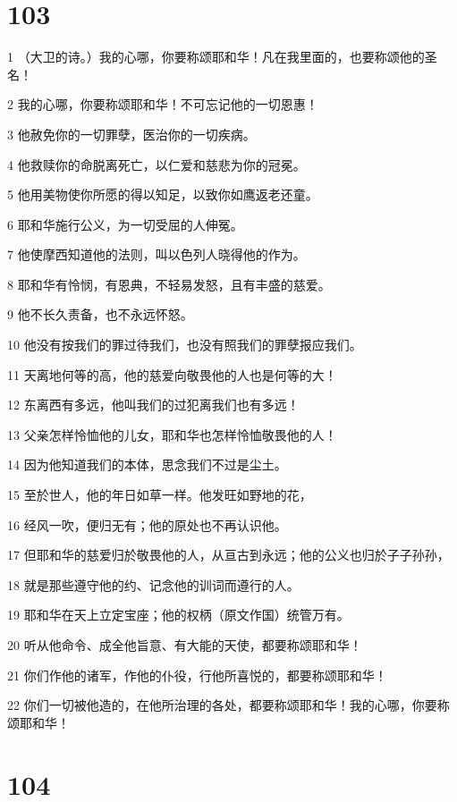 \chapter{103}

\par 1 （大卫的诗。）我的心哪，你要称颂耶和华！凡在我里面的，也要称颂他的圣名！
\par 2 我的心哪，你要称颂耶和华！不可忘记他的一切恩惠！
\par 3 他赦免你的一切罪孽，医治你的一切疾病。
\par 4 他救赎你的命脱离死亡，以仁爱和慈悲为你的冠冕。
\par 5 他用美物使你所愿的得以知足，以致你如鹰返老还童。
\par 6 耶和华施行公义，为一切受屈的人伸冤。
\par 7 他使摩西知道他的法则，叫以色列人晓得他的作为。
\par 8 耶和华有怜悯，有恩典，不轻易发怒，且有丰盛的慈爱。
\par 9 他不长久责备，也不永远怀怒。
\par 10 他没有按我们的罪过待我们，也没有照我们的罪孽报应我们。
\par 11 天离地何等的高，他的慈爱向敬畏他的人也是何等的大！
\par 12 东离西有多远，他叫我们的过犯离我们也有多远！
\par 13 父亲怎样怜恤他的儿女，耶和华也怎样怜恤敬畏他的人！
\par 14 因为他知道我们的本体，思念我们不过是尘土。
\par 15 至於世人，他的年日如草一样。他发旺如野地的花，
\par 16 经风一吹，便归无有；他的原处也不再认识他。
\par 17 但耶和华的慈爱归於敬畏他的人，从亘古到永远；他的公义也归於子子孙孙，
\par 18 就是那些遵守他的约、记念他的训词而遵行的人。
\par 19 耶和华在天上立定宝座；他的权柄（原文作国）统管万有。
\par 20 听从他命令、成全他旨意、有大能的天使，都要称颂耶和华！
\par 21 你们作他的诸军，作他的仆役，行他所喜悦的，都要称颂耶和华！
\par 22 你们一切被他造的，在他所治理的各处，都要称颂耶和华！我的心哪，你要称颂耶和华！

\chapter{104}

